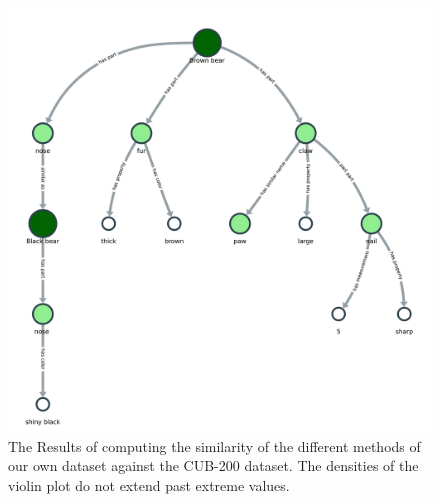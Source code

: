 \documentclass[a4paper, 12pt, oneside]{book} %
\begin{document}
\begin{figure}[htpb]
 \centering
 \includegraphics[width=\textwidth]{figures/kngraph_rec.pdf}
 \caption[Knowledge Graph Future Example]{The Results of computing the similarity of the different methods of our own dataset against the CUB-200 dataset. The densities of the violin plot do not extend past extreme values.}
 \label{fig:kngraph_rec}
\end{figure}


\printbibliography
\newpage
\end{document}
